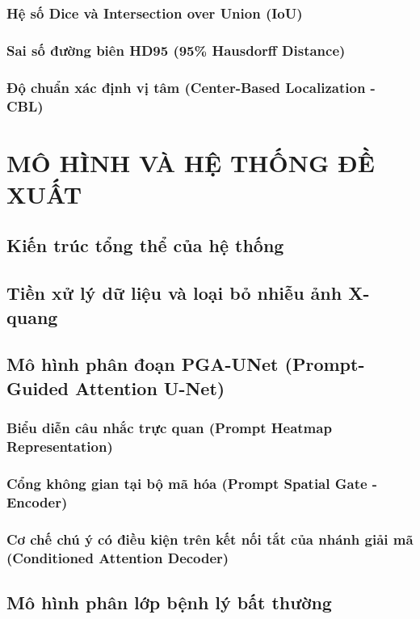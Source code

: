 \documentclass[a4paper,12pt,oneside]{report}
\begin{document}
\subsection{Hệ số Dice và Intersection over Union (IoU)}
\subsection{Sai số đường biên HD95 (95\% Hausdorff Distance)}
\subsection{Độ chuẩn xác định vị tâm (Center-Based Localization - CBL)}

\chapter{MÔ HÌNH VÀ HỆ THỐNG ĐỀ XUẤT}
\section{Kiến trúc tổng thể của hệ thống}
\section{Tiền xử lý dữ liệu và loại bỏ nhiễu ảnh X-quang}
\section{Mô hình phân đoạn PGA-UNet (Prompt-Guided Attention U-Net)}
\subsection{Biểu diễn câu nhắc trực quan (Prompt Heatmap Representation)}
\subsection{Cổng không gian tại bộ mã hóa (Prompt Spatial Gate - Encoder)}
\subsection{Cơ chế chú ý có điều kiện trên kết nối tắt của nhánh giải mã (Conditioned Attention Decoder)}
\section{Mô hình phân lớp bệnh lý bất thường}
\end{document}
